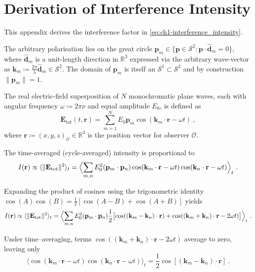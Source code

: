 \chapter{Derivation of Interference Intensity}
\label{app:interference-derivation}

This appendix derives the interference factor in \eqref{eq:ch1-interference_intensity}.

The arbitrary polarisation lies on the great circle
$\mathbf{p}_m \in \{\mathbf{p} \in \mathcal{S}^2 : \mathbf{p} \cdot \hat{\mathbf{d}}_m = 0\}$, where $\hat{\mathbf{d}}_m$ is a unit-length direction in $\mathbb{R}^3$ expressed via the arbitrary wave-vector as $\mathbf{k}_m \coloneqq \frac{2\pi}{\lambda} \hat{\mathbf{d}}_m \in \mathcal{S}^2$. The domain of $\mathbf{p}_m$ is itself an $\mathcal{S}^1 \subset \mathcal{S}^2$ and by construction $\|\mathbf{p}_m \| = 1$.

The real electric-field superposition of $N$ monochromatic plane waves, each with angular frequency $\omega \coloneqq 2\pi \nu$ and equal amplitude $E_0$, is defined as
\begin{equation}
   \mathbf{E}_{\text{tot}}(t,\mathbf{r}) = \sum_{m=1}^N E_0 \mathbf{p}_m \cos(\mathbf{k}_m \cdot \mathbf{r} - \omega t) \ ,
\end{equation}
where $\mathbf{r}\coloneqq(x,y,z)_{\mathcal{O}} \in \mathbb{R}^3$ is the position vector for observer $\mathcal{O}$.

\noindent
The time-averaged (cycle-averaged) intensity is proportional to
\begin{equation}
   I(\mathbf{r}) \propto \langle \| \mathbf{E}_{\text{tot}} \|^2 \rangle_t  = \Bigl\langle \sum_{m,n} E_0^2 (\mathbf{p}_m \cdot \mathbf{p}_n) \cos(\mathbf{k}_m \cdot \mathbf{r} - \omega t) \cos(\mathbf{k}_n \cdot \mathbf{r} - \omega t) \Bigr\rangle_t \ .
\end{equation}

\noindent
Expanding the product of cosines using the trigonometric identity $\cos(A)\cos(B) = \frac{1}{2}[ \cos(A-B) + \cos(A+B)]$ yields
\begin{equation}
   I(\mathbf{r}) \propto \langle \| \mathbf{E}_{\text{tot}} \|^2 \rangle_t  = \Bigl\langle \sum_{m,n} E_0^2 (\mathbf{p}_m \cdot \mathbf{p}_n)
   \frac{1}{2} \bigl[ \cos((\mathbf{k}_m - \mathbf{k}_n) \cdot \mathbf{r}) + \cos((\mathbf{k}_m + \mathbf{k}_n) \cdot \mathbf{r} - 2\omega t) \bigr] \Bigr\rangle_t \ .
\end{equation}

\noindent
Under time--averaging, terms $\cos((\mathbf{k}_m + \mathbf{k}_n) \cdot \mathbf{r} - 2\omega t)$ average to zero, leaving only
\[
   \bigl\langle \cos(\mathbf{k}_m \cdot \mathbf{r} - \omega t) \cos(\mathbf{k}_n \cdot \mathbf{r} - \omega t) \bigr\rangle_t = \frac{1}{2} \cos[(\mathbf{k}_m - \mathbf{k}_n) \cdot \mathbf{r}] \ .
\]

